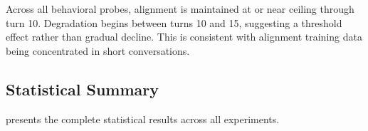 Across all behavioral probes, alignment is maintained at or near ceiling through turn 10. Degradation begins between turns 10 and 15, suggesting a threshold effect rather than gradual decline. This is consistent with alignment training data being concentrated in short conversations.

\subsection{Statistical Summary}
\label{sec:stats_summary}

 presents the complete statistical results across all experiments.

\begin{table}[t]
\centering
\caption{Statistical summary across all probe types and models. Significant results ($p < 0.05$) in \textbf{bold}. Formatting probes show large, significant degradation effects; safety probes show no significant trends.}
\label{tab:stats_summary}
\vspace{4pt}
\end{table}
